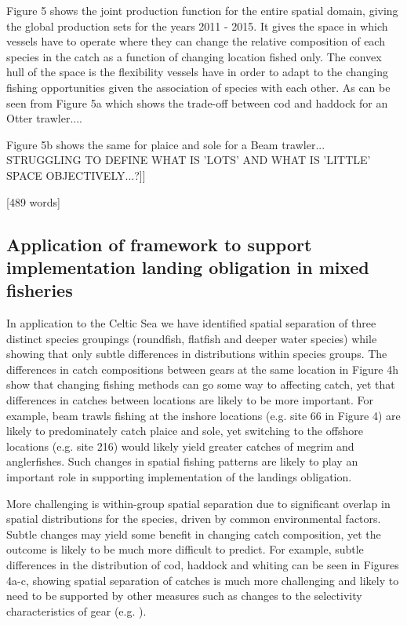 \documentclass{nature}
\begin{document}
\begin{linenumbers}
[[WORK IN PROGRESS, NOT SURE WHETHER TO KEEP OR DEVELOP...	
[SUGGEST WE JUST CITE THE REFERENCE TO THIS IN THE DISCUSSION PAUL AS WE NEED TO KEEP THE MESSAGE SIMPLE - `SPATIOTEMPORAL COMPLEXITY REDUCED']
Figure 5 shows the joint production function for the entire spatial domain,
giving the global production sets for the years 2011 - 2015. It gives the space
in which vessels have to operate where they can change the relative composition
of each species in the catch as a function of changing location fished only.
The convex hull of the space is the flexibility vessels have in order to adapt
to the changing fishing opportunities given the association of species with
each other\cite{Reimer2017}. As can be seen from Figure 5a which shows the
trade-off between cod and haddock for an Otter trawler....

Figure 5b shows the same for plaice and sole for a Beam trawler...
STRUGGLING TO DEFINE WHAT IS 'LOTS' AND WHAT IS 'LITTLE' SPACE
OBJECTIVELY...?]]

[489 words]

\subsection{Application of framework to support implementation landing
	obligation in mixed fisheries}
In application to the
Celtic Sea we have identified spatial separation of three distinct species
groupings (roundfish, flatfish and deeper water species) while showing that
only subtle differences in distributions within species groups. The differences
in catch compositions between gears at the same location in Figure 4h show that
changing fishing methods can go some way to affecting catch, yet that
differences in catches between locations are likely to be more important. For
example, beam trawls fishing at the inshore locations (e.g. site 66 in Figure
4) are likely to predominately catch plaice and sole, yet switching to the
offshore locations (e.g. site 216) would likely yield greater catches of megrim
and anglerfishes. Such changes in spatial fishing patterns are likely to play
an important role in supporting implementation of the landings obligation.

More challenging is within-group spatial separation due to significant overlap
in spatial distributions for the species, driven by common environmental
factors. Subtle changes may yield some benefit in changing catch composition,
yet the outcome is likely to be much more difficult to predict. For example,
subtle differences in the distribution of cod, haddock and whiting can be seen
in Figures 4a-c, showing spatial separation of catches is much more challenging
and likely to need to be supported by other measures such as changes to the
selectivity characteristics of gear (e.g. \cite{Santos2016}). 


\end{linenumbers}
\end{document}
